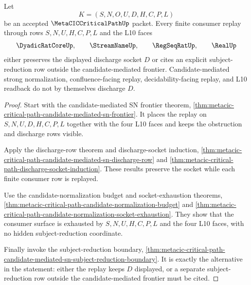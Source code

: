 \begin{theorem}
\label{thm:metacic-critical-path-candidate-mediated-sn-frontier-discharge-coverage}
Let
$$
K=(S,N,O,U,D,H,C,P,L)
$$
be an accepted $\MetaCICCriticalPathUp$ packet. Every finite consumer replay through rows $S,N,U,H,C,P,L$ and the L10 faces
$$
\DyadicRatCoreUp,\qquad
\StreamNameUp,\qquad
\RegSeqRatUp,\qquad
\RealUp
$$
either preserves the displayed discharge socket $D$ or cites an explicit subject-reduction row outside the candidate-mediated frontier. Candidate-mediated strong normalization, confluence-facing replay, decidability-facing replay, and L10 readback do not by themselves discharge $D$.
\end{theorem}
\begin{proof}
Start with the candidate-mediated SN frontier theorem, \autoref{thm:metacic-critical-path-candidate-mediated-sn-frontier}. It places the replay on $S,N,U,D,H,C,P,L$ together with the four L10 faces and keeps the obstruction and discharge rows visible.

Apply the discharge-row theorem and discharge-socket induction, \autoref{thm:metacic-critical-path-candidate-mediated-sn-discharge-row} and \autoref{thm:metacic-critical-path-discharge-socket-induction}. These results preserve the socket while each finite consumer row is replayed.

Use the candidate-normalization budget and socket-exhaustion theorems, \autoref{thm:metacic-critical-path-candidate-normalization-budget} and \autoref{thm:metacic-critical-path-candidate-normalization-socket-exhaustion}. They show that the consumer surface is exhausted by $S,N,U,H,C,P,L$ and the four L10 faces, with no hidden subject-reduction coordinate.

Finally invoke the subject-reduction boundary, \autoref{thm:metacic-critical-path-candidate-mediated-sn-subject-reduction-boundary}. It is exactly the alternative in the statement: either the replay keeps $D$ displayed, or a separate subject-reduction row outside the candidate-mediated frontier must be cited.
\end{proof}

